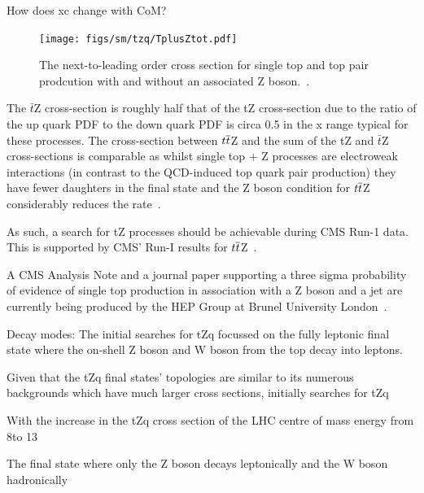How does xc change with CoM?

\begin{figure}[h]
\centering
\texttt{[image: figs/sm/tzq/TplusZtot.pdf]}
\caption{The next-to-leading order cross section for single top and top pair prodcution with and without an associated Z boson.~\cite{Campbell:2013yla}.
}
\label{fig:topCrossSections}
\end{figure}



The $\bar{t}$Z cross-section is roughly half that of the tZ cross-section due to the ratio of the up quark PDF to the down quark PDF is circa 0.5 in the x range typical for these processes\cite{Campbell:2013yla}. 
The cross-section between $t\overline{t}$Z and the sum of the tZ and $\bar{t}$Z cross-sections is comparable as whilst single top + Z processes are electroweak interactions (in contrast to the QCD-induced top quark pair production) they have fewer daughters in the final state and the Z boson condition for $t\overline{t}$Z considerably reduces the rate~\cite{Campbell:2013yla}.

As such, a search for tZ processes should be achievable during CMS Run-1 data. This is supported by CMS’ Run-I results for $t\overline{t}$Z~\cite{Khachatryan:2014ewa}. 

A CMS Analysis Note and a journal paper supporting a three sigma probability of evidence of single top production in association with a Z boson and a jet are currently being produced by the HEP Group at Brunel University London~\cite{Sirunyan:2017kkr}.

Decay modes:
The initial searches for tZq focussed on the fully leptonic final state where the on-shell Z boson and W boson from the top decay into leptons.

Given that the tZq final states' topologies are similar to its numerous backgrounds which have much larger cross sections, initially searches for tZq 

With the increase in the tZq cross section 
of the LHC centre of mass energy from 8\TeV to 13\TeV

The final state where only the Z boson decays leptonically and the W boson hadronically


